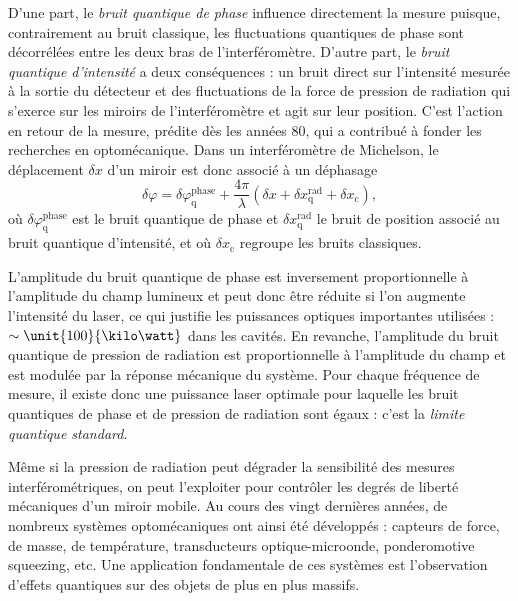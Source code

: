 \documentclass[12pt,a4paper]{article}
\begin{document}
D'une part, le \textit{bruit quantique de phase} influence directement la mesure puisque, contrairement au bruit classique, les fluctuations quantiques de phase sont décorrélées entre les deux bras de l'interféromètre.
D'autre part, le \textit{bruit quantique d'intensité} a deux conséquences : un bruit direct sur l'intensité mesurée à la sortie du détecteur et des fluctuations de la force de pression de radiation qui s'exerce sur les miroirs de l'interféromètre et agit sur leur position.
C'est l'action en retour de la mesure, prédite dès les années 80, qui a contribué à fonder les recherches en optomécanique.
Dans un interféromètre de Michelson, le déplacement $\delta x$ d'un miroir est donc associé à un déphasage
\begin{equation}
\delta \varphi = \delta \varphi ^\mathrm{phase} _\mathrm{q} + \frac{4\pi}{\lambda} ( \delta x + \delta x ^\mathrm{rad} _\mathrm{q} + \delta x_\mathrm{c}),
\label{eq:disp}
\end{equation}
où $\delta \varphi ^\mathrm{phase} _\mathrm{q}$ est le bruit quantique de phase et $\delta x ^\mathrm{rad} _\mathrm{q}$ le bruit de position associé au bruit quantique d'intensité, et où $\delta x_\mathrm{c}$ regroupe les bruits classiques.



L'amplitude du bruit quantique de phase est inversement proportionnelle à l'amplitude du champ lumineux et peut donc être réduite si l'on augmente l'intensité du laser, ce qui justifie les puissances optiques importantes utilisées : $\sim \unit{100}{\kilo\watt}$ dans les cavités.
En revanche, l'amplitude du bruit quantique de pression de radiation est proportionnelle à l'amplitude du champ et est modulée par la réponse mécanique du système.
Pour chaque fréquence de mesure, il existe donc une puissance laser optimale pour laquelle les bruit quantiques de phase et de pression de radiation sont égaux : c'est la \textit{limite quantique standard}.

Même si la pression de radiation peut dégrader la sensibilité des mesures interférométriques, on peut l'exploiter pour contrôler les degrés de liberté mécaniques d'un miroir mobile.
Au cours des vingt dernières années, de nombreux systèmes optomécaniques ont ainsi été développés : capteurs de force, de masse, de température, transducteurs optique-microonde, ponderomotive squeezing, etc.
Une application fondamentale de ces systèmes est l'observation d'effets quantiques sur des objets de plus en plus massifs.
\end{document}
